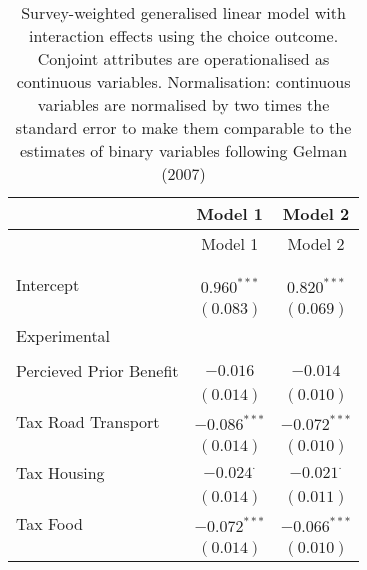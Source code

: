 
\begin{center}
\begin{tiny}
\begin{longtable}{l@{} c@{} c@{}}
\hline
 & Model 1 & Model 2 \\
\hline
\endfirsthead
\hline
 & Model 1 & Model 2 \\
\hline
\endhead
\hline
\endfoot
\hline
\multicolumn{3}{l}{\tiny{$^{***}p<0.001$; $^{**}p<0.01$; $^{*}p<0.05$; $^{\cdot}p<0.1$}}\\
\caption{Survey-weighted generalised linear model with interaction effects using the choice outcome. Conjoint attributes are operationalised as continuous variables. Normalisation: continuous variables are normalised by two times 
               the standard error to make them comparable to the estimates of binary variables following Gelman (2007)}
\label{table:weighted_interactions_exp_continous_choice}
\endlastfoot \\
Intercept                                              & $0.960^{***}$    & $0.820^{***}$    \\
                                                       & $(0.083)$        & $(0.069)$        \\
Experimental                                           &                  &                  \\
                                                       &                  &                  \\
\quad Percieved Prior Benefit                          & $-0.016$         & $-0.014$         \\
                                                       & $(0.014)$        & $(0.010)$        \\
\quad Tax Road Transport                               & $-0.086^{***}$   & $-0.072^{***}$   \\
                                                       & $(0.014)$        & $(0.010)$        \\
\quad Tax Housing                                      & $-0.024^{\cdot}$ & $-0.021^{\cdot}$ \\
                                                       & $(0.014)$        & $(0.011)$        \\
\quad Tax Food                                         & $-0.072^{***}$   & $-0.066^{***}$   \\
                                                       & $(0.014)$        & $(0.010)$        \\

\end{longtable}
\end{tiny}
\end{center}
